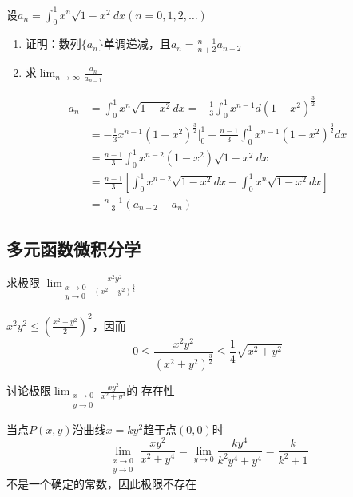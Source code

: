 \documentclass{article}
\begin{document}
\begin{examplle}[]
设\(a_n=\displaystyle\int_0^1x^n\sqrt{1-x^2}dx(n=0,1,2,\dots)\)
\begin{enumerate}
\item 证明：数列\(\{a_n\}\)单调递减，且\(a_n=\frac{n-1}{n+2}a_{n-2}\)
\item 求\(\displaystyle\lim_{n\to\infty}\frac{a_n}{a_{n-1}}\)
\end{enumerate}


\begin{align*}
a_n&=\int_0^1x^n\sqrt{1-x^2}dx=-\frac{1}{3}\int_0^1x^{n-1}d(1-x^2)^{\frac{3}{2}}\\
&=-\frac{1}{3}x^{n-1}(1-x^2)^{\frac{3}{2}}\Big\rvert_0^1+\frac{n-1}{3}
\int_0^1x^{n-1}(1-x^2)^{\frac{3}{2}}dx\\
&=\frac{n-1}{3}\int_0^1x^{n-2}(1-x^2)\sqrt{1-x^2}dx \\
&=\frac{n-1}{3}\left[
\int_0^1x^{n-2}\sqrt{1-x^2}dx-\int_0^1x^n\sqrt{1-x^2}dx
\right]\\
&=\frac{n-1}{3}(a_{n-2}-a_n)
\end{align*}
\end{examplle}
\subsection{多元函数微积分学}
\label{sec:org4552b8d}
\begin{examplle}[]
求极限
\(\displaystyle\lim_{\substack{x\to0\\y\to0}}\frac{x^2y^2}{(x^2+y^2)^{\frac{3}{2}}}\)

\(x^2y^2\le(\frac{x^2+y^2}{2})^2\)，因而
\begin{equation*}
0\le \frac{x^2y^2}{(x^2+y^2)^{\frac{3}{2}}}\le\frac{1}{4}\sqrt{x^2+y^2}
\end{equation*}
\end{examplle}

\begin{examplle}[]
讨论极限\(\displaystyle\lim_{\substack{x\to0\\y\to0}}\frac{xy^2}{x^2+y^4}\)的
存在性

当点\(P(x,y)\)沿曲线\(x=ky^2\)趋于点\((0,0)\)时
\begin{equation*}
\lim_{\substack{x\to0\\y\to0}}\frac{xy^2}{x^2+y^4}=
\lim_{y\to0}\frac{ky^4}{k^2y^4+y^4}=\frac{k}{k^2+1}
\end{equation*}
不是一个确定的常数，因此极限不存在
\end{examplle}
\end{document}

